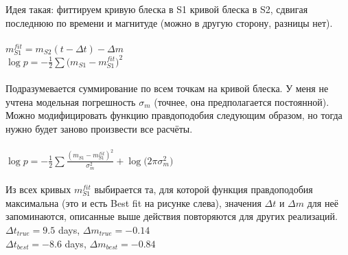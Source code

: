 \noindent Идея такая: фиттируем кривую блеска в S1 кривой блеска в S2, сдвигая последнюю по времени и магнитуде (можно в другую сторону, разницы нет). \\ \\
$m_{S1}^{fit} = m_{S2}(t - \Delta t)-\Delta m$ \\

$\log p = -\frac{1}{2} \sum \big( m_{S1} - m_{S1}^{fit} \big)^2$ \rightarrow \max \\ \\

\noindent Подразумевается суммирование по всем точкам на кривой блеска. У меня не учтена модельная погрешность $\sigma_m$ (точнее, она предполагается постоянной). Можно модифицировать функцию правдоподобия следующим образом, но тогда нужно будет заново произвести все расчёты. \\ \\

$\log p = -\frac{1}{2} \sum \frac{( m_{S1} - m_{S1}^{fit} )^2}{\sigma_m^2} + \log \big( 2\pi\sigma_m^2 \big)$ \\ \\

\noindent Из всех кривых $m_{S1}^{fit}$ выбирается та, для которой функция правдоподобия максимальна (это и есть Best fit на рисунке слева), значения $\Delta t$ и $\Delta m$ для неё запоминаются, описанные выше действия повторяются для других реализаций. \\

$\Delta t_{true} = 9.5$ days, 
$\Delta m_{true} = -0.14$ \\
$\Delta t_{best} = -8.6$ days,
$\Delta m_{best} = -0.84$ 


\newpage